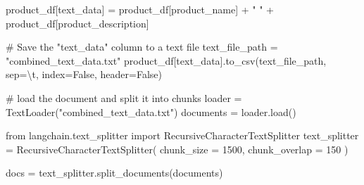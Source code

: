 \documentclass[
  letterpaper,
  DIV=11,
  numbers=noendperiod]{scrreprt}
\newenvironment{Shaded}{\begin{snugshade}}{\end{snugshade}}
\newcommand{\CharTok}[1]{\textcolor[rgb]{0.13,0.47,0.30}{#1}}
\newcommand{\CommentTok}[1]{\textcolor[rgb]{0.37,0.37,0.37}{#1}}
\newcommand{\DecValTok}[1]{\textcolor[rgb]{0.68,0.00,0.00}{#1}}
\newcommand{\ImportTok}[1]{\textcolor[rgb]{0.00,0.46,0.62}{#1}}
\newcommand{\NormalTok}[1]{\textcolor[rgb]{0.00,0.23,0.31}{#1}}
\newcommand{\OperatorTok}[1]{\textcolor[rgb]{0.37,0.37,0.37}{#1}}
\newcommand{\StringTok}[1]{\textcolor[rgb]{0.13,0.47,0.30}{#1}}
\newcommand{\VariableTok}[1]{\textcolor[rgb]{0.07,0.07,0.07}{#1}}
\begin{document}
\begin{Shaded}
\begin{Highlighting}[]
\NormalTok{product\_df[}\StringTok{\textquotesingle{}text\_data\textquotesingle{}}\NormalTok{] }\OperatorTok{=}\NormalTok{ product\_df[}\StringTok{\textquotesingle{}product\_name\textquotesingle{}}\NormalTok{] }\OperatorTok{+} \StringTok{" "} \OperatorTok{+}\NormalTok{ product\_df[}\StringTok{\textquotesingle{}product\_description\textquotesingle{}}\NormalTok{]}
\end{Highlighting}
\end{Shaded}

\begin{Shaded}
\begin{Highlighting}[]
\CommentTok{\# Save the "text\_data" column to a text file}
\NormalTok{text\_file\_path }\OperatorTok{=} \StringTok{"combined\_text\_data.txt"}
\NormalTok{product\_df[}\StringTok{\textquotesingle{}text\_data\textquotesingle{}}\NormalTok{].to\_csv(text\_file\_path, sep}\OperatorTok{=}\StringTok{\textquotesingle{}}\CharTok{\textbackslash{}t}\StringTok{\textquotesingle{}}\NormalTok{, index}\OperatorTok{=}\VariableTok{False}\NormalTok{, header}\OperatorTok{=}\VariableTok{False}\NormalTok{)}
\end{Highlighting}
\end{Shaded}

\begin{Shaded}
\begin{Highlighting}[]
\CommentTok{\# load the document and split it into chunks}
\NormalTok{loader }\OperatorTok{=}\NormalTok{ TextLoader(}\StringTok{"combined\_text\_data.txt"}\NormalTok{)}
\NormalTok{documents }\OperatorTok{=}\NormalTok{ loader.load()}
\end{Highlighting}
\end{Shaded}

\begin{Shaded}
\begin{Highlighting}[]
\ImportTok{from}\NormalTok{ langchain.text\_splitter }\ImportTok{import}\NormalTok{ RecursiveCharacterTextSplitter}
\NormalTok{text\_splitter }\OperatorTok{=}\NormalTok{ RecursiveCharacterTextSplitter(}
\NormalTok{    chunk\_size }\OperatorTok{=} \DecValTok{1500}\NormalTok{,}
\NormalTok{    chunk\_overlap }\OperatorTok{=} \DecValTok{150}
\NormalTok{)}

\NormalTok{docs }\OperatorTok{=}\NormalTok{ text\_splitter.split\_documents(documents)}
\end{Highlighting}
\end{Shaded}
\end{document}
